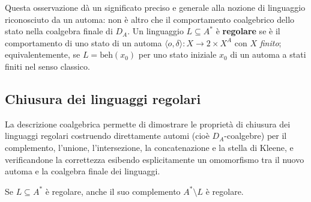 Questa osservazione dà un significato preciso e generale alla nozione di linguaggio riconosciuto da un automa: non è altro che il comportamento coalgebrico dello stato nella coalgebra finale di \(D_A\). Un linguaggio \(L \subseteq A^*\) è \textbf{regolare} se è il comportamento di uno stato di un automa \(\langle o, \delta \rangle : X \to 2 \times X^A\) con \(X\) \textit{finito}; equivalentemente, se \(L = \mathrm{beh}(x_0)\) per uno stato iniziale \(x_0\) di un automa a stati finiti nel senso classico.

\subsection{Chiusura dei linguaggi regolari}

La descrizione coalgebrica permette di dimostrare le proprietà di chiusura dei linguaggi regolari \cite{hopcroft2006,sipser2013} costruendo direttamente automi (cioè \(D_A\)-coalgebre) per il complemento, l'unione, l'intersezione, la concatenazione e la stella di Kleene, e verificandone la correttezza esibendo esplicitamente un omomorfismo tra il nuovo automa e la coalgebra finale dei linguaggi.

\begin{proposition}
  Se \(L \subseteq A^*\) è regolare, anche il suo complemento \(A^* \setminus L\) è regolare.
\end{proposition}

